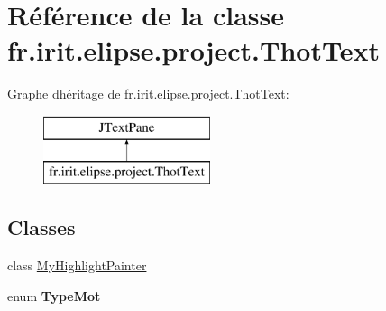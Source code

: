 \hypertarget{classfr_1_1irit_1_1elipse_1_1project_1_1_thot_text}{}\section{Référence de la classe fr.\+irit.\+elipse.\+project.\+Thot\+Text}
\label{classfr_1_1irit_1_1elipse_1_1project_1_1_thot_text}
Graphe d\textquotesingle{}héritage de fr.\+irit.\+elipse.\+project.\+Thot\+Text\+:\begin{figure}[H]
\begin{center}
\leavevmode
\includegraphics[height=2.000000cm]{classfr_1_1irit_1_1elipse_1_1project_1_1_thot_text}
\end{center}
\end{figure}
\subsection*{Classes}
\begin{DoxyCompactItemize}
\item 
class \mbox{\hyperlink{classfr_1_1irit_1_1elipse_1_1project_1_1_thot_text_1_1_my_highlight_painter}{My\+Highlight\+Painter}}
\item 
enum {\bfseries Type\+Mot}
\end{DoxyCompactItemize}

